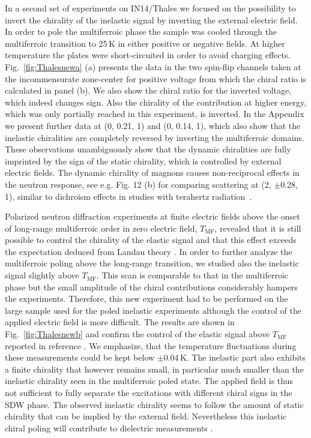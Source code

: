 \documentclass[aps,prb,twocolumn,superscriptaddress,showpacs,floatfix]{revtex4-2}
\begin{document}
In a second set of experiments on IN14/Thales we focused on the possibility to invert the chirality of the inelastic signal by inverting the external electric field. In order to pole the multiferroic phase the sample was cooled through the multiferroic transition to 25\,K in either positive or negative fields.
At higher temperature the plates were short-circuited in order to avoid charging effects.
Fig.~\ref{fig:Thalesnewa} (a) presents the data in the two spin-flip channels taken at the incommensurate zone-center for positive voltage from which the chiral
ratio is calculated in panel (b).
We also show the chiral ratio for the inverted voltage, which indeed changes sign.
Also the chirality of the contribution at higher energy, which was only partially reached in this experiment, is inverted.
In the Appendix we present further data at (0, 0.21, 1) and (0, 0.14, 1), which also show that the inelastic chiralities
are completely reversed by inverting the multiferroic domains. 
These observations unambiguously show that the dynamic
chiralities are fully imprinted by the sign of the static chirality, which is controlled by external electric fields. The dynamic chirality of magnons causes non-reciprocal effects in the neutron
response, see e.g. Fig. 12 (b) for comparing scattering at (2, $\pm$0.28, 1), similar to dichroism effects
in studies with terahertz radiation~\cite{Bordacs2012}.

Polarized neutron diffraction experiments at finite electric fields above the onset of long-range multiferroic order in zero electric field, $T_{\textrm{MF}}$,
revealed that it is still possible to control the chirality of the elastic signal and that this effect exceeds the expectation deduced from Landau theory \cite{Stein2017}.
In order to further analyze the multiferroic poling above the long-range transition, we studied also the inelastic signal slightly above $T_{\textrm{MF}}$.
This scan is comparable to that in the multiferroic phase but
the small amplitude of the chiral contributions considerably hampers the experiments.
Therefore, this new experiment had to be performed on the  large
sample used for the poled inelastic experiments although the control of the applied electric field is more difficult. The results are shown in Fig.~\ref{fig:Thalesnewb} and confirm the control of the elastic signal above $T_{\textrm{MF}}$ reported in reference \cite{Stein2017}.
We emphasize, that the temperature fluctuations during these measurements could be kept below $\pm$0.04\,K.
The inelastic part also exhibits a finite chirality that however remains small, in particular much smaller than
the inelastic chirality seen in the multiferroic poled state.
The applied field is thus not sufficient to fully separate the excitations with different chiral signs in the SDW phase.
The observed inelastic chirality seems to follow the amount of static chirality that can be implied by the external field.
Nevertheless this inelastic chiral poling will
contribute to dielectric measurements \cite{Schrettle2009,Foggetti2020}.
\end{document}
